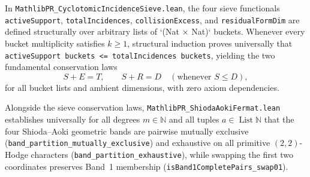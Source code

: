 \documentclass[11pt,a4paper]{article}
\begin{document}
In \texttt{MathlibPR\_CyclotomicIncidenceSieve.lean}, the four sieve functionals \texttt{activeSupport}, \texttt{totalIncidences}, \texttt{collisionExcess}, and \texttt{residualFormDim} are defined structurally over arbitrary lists of `(Nat × Nat)` buckets. Whenever every bucket multiplicity satisfies $k \ge 1$, structural induction proves universally that \texttt{activeSupport buckets <= totalIncidences buckets}, yielding the two fundamental conservation laws
\begin{equation}
  S + E = T, \qquad S + R = D \quad (\text{whenever } S \le D),
\end{equation}
for all bucket lists and ambient dimensions, with zero axiom dependencies.

Alongside the sieve conservation laws, \texttt{MathlibPR\_ShiodaAokiFermat.lean} establishes universally for all degrees $m \in \mathbb{N}$ and all tuples $a \in \operatorname{List} \mathbb{N}$ that the four Shioda--Aoki geometric bands are pairwise mutually exclusive (\texttt{band\_partition\_mutually\_exclusive}) and exhaustive on all primitive $(2,2)$-Hodge characters (\texttt{band\_partition\_exhaustive}), while swapping the first two coordinates preserves Band~1 membership (\texttt{isBand1CompletePairs\_swap01}).
\end{document}
